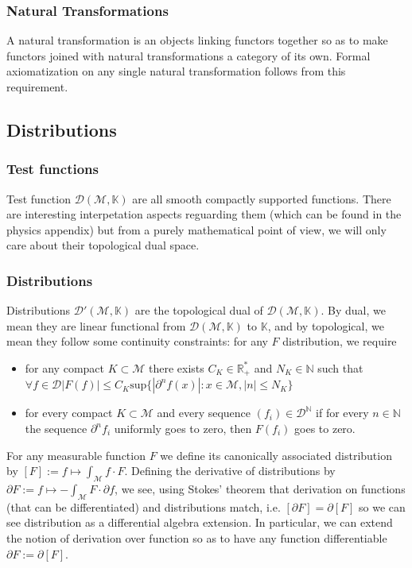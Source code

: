 \documentclass[a4paper,11pt]{article}
\numberwithin{equation}{section}
\theoremstyle{definition}
\begin{document}
\subsubsection{Natural Transformations}
A natural transformation is an objects linking functors together so as to make functors joined with natural transformations a category of its own. Formal axiomatization on any single natural transformation follows from this requirement.



\subsection{Distributions}\label{DistribMath}
\subsubsection{Test functions}
    Test function $\mathcal{D}(\mathcal{M},\mathbb{K})$ are all smooth compactly supported functions. There are interesting interpetation aspects reguarding them (which can be found in the physics appendix) but from a purely mathematical point of view, we will only care about their topological dual space.
\subsubsection{Distributions}
    Distributions $\mathcal{D}'(\mathcal{M},\mathbb{K})$ are the topological dual of $\mathcal{D}(\mathcal{M},\mathbb{K})$. By dual, we mean they are linear functional from $\mathcal{D}(\mathcal{M},\mathbb{K})$ to $\mathbb{K}$, and by topological, we mean they follow some continuity constraints: for any $F$ distribution, we require
    \begin{itemize}
        \item for any compact $K\subset\mathcal{M}$ there exists $C_K\in \mathbb{R}_+^*$ and $N_K\in\mathbb{N}$ such that \\ $\forall f \in \mathcal{D} |F(f)|\leq C_K \mathrm{sup}\{|\partial^nf(x)|:x\in\mathcal{M},|n|\leq N_K\}$
        \item for every compact $K\subset\mathcal{M}$ and every sequence $(f_i)\in \mathcal{D}^\mathbb{N}$ if for every $n\in\mathbb{N}$ the sequence $\partial^nf_i$ uniformly goes to zero, then $F(f_i)$ goes to zero.
    \end{itemize}

    For any measurable function $F$ we define its canonically associated distribution by $[F]:=f\mapsto\int_\mathcal{M}f\cdot F$. Defining the derivative of distributions by $\partial F:= f\mapsto -\int_\mathcal{M}F\cdot\partial f$, we see, using Stokes' theorem that derivation on functions (that can be differentiated) and distributions match, i.e. $[\partial F]=\partial[F]$ so we can see distribution as a differential algebra extension. In particular, we can extend the notion of derivation over function so as to have any function differentiable $\partial F := \partial [F]$.
\end{document}
